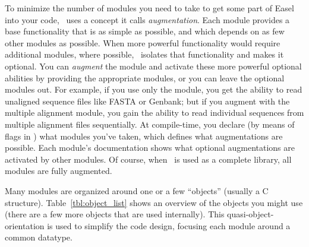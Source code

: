 To minimize the number of modules you need to take to get some part of
Easel into your code, \Easel\ uses a concept it calls
\emph{augmentation}. Each module provides a base functionality that is
as simple as possible, and which depends on as few other modules as
possible. When more powerful functionality would require additional
modules, where possible, \Easel\ isolates that functionality and makes
it optional. You can \emph{augment} the module and activate these more
powerful optional abilities by providing the appropriate modules, or
you can leave the optional modules out.  For example, if you use only
the  module, you get the ability to read unaligned
sequence files like FASTA or Genbank; but if you augment 
with the  multiple alignment module, you gain the ability
to read individual sequences from multiple alignment files
sequentially. At compile-time, you declare (by means of
 flags in ) what modules you've taken,
which defines what augmentations are possible. Each module's
documentation shows what optional augmentations are activated by other
modules. Of course, when \Easel\ is used as a complete
 library, all modules are fully augmented.




Many modules are organized around one or a few ``objects'' (usually a
C structure). Table~\ref{tbl:object_list} shows an overview of the
objects you might use (there are a few more objects that are used
internally). This quasi-object-orientation is used to simplify the
code design, focusing each module around a common datatype. 


